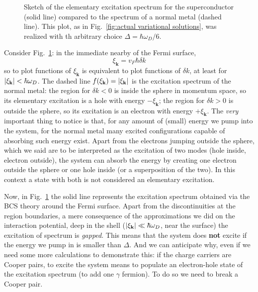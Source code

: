 \begin{figure}
	\centering
	
	\caption{Sketch of the elementary excitation spectrum for the superconductor (solid line) compared to the spectrum of a normal metal (dashed line). This plot, as in Fig.~\ref{fig:actual variational solutions}, was realized with th arbitrary choice $\Delta=\hbar\omega_D/6$.}
	\label{fig:excitation spectrum}
\end{figure}

Consider Fig.~\ref{fig:excitation spectrum}: in the immediate nearby of the Fermi surface,
\[
	\xi_\mathbf{k} = v_F \hbar \delta k
\]
so to plot functions of $\xi_{\mathbf{k}}$ is equivalent to plot functions of $\delta k$, at least for $\abs{\xi_\mathbf{k}} < \hbar\omega_D$. The dashed line $f(\xi_{\mathbf{k}}) = \abs{\xi_{\mathbf{k}}}$ is the excitation spectrum of the normal metal: the region for $\delta k < 0$ is inside the sphere in momentum space, so its elementary excitation is a hole with energy $-\xi_{\mathbf{k}}$; the region for $\delta k > 0$ is outside the sphere, so its excitation is an electron with energy $+\xi_{\mathbf{k}}$. The \textit{very} important thing to notice is that, for any amount of (small) energy we pump into the system, for the normal metal many excited configurations capable of absorbing such energy exist. Apart from the electrons jumping outside the sphere, which we said are to be interpreted as the excitation of two modes (hole inside, electron outside), the system can absorb the energy by creating one electron outside the sphere or one hole inside (or a superposition of the two). In this context a state with both is not considered an elementary excitation.

Now, in Fig.~\ref{fig:excitation spectrum} the solid line represents the excitation spectrum obtained via the BCS theory around the Fermi surface. Apart from the discontinuities at the region boundaries, a mere consequence of the approximations we did on the interaction potential, deep in the shell ($\abs{\xi_\mathbf{k}}\ll\hbar\omega_D$, near the surface) the excitation of spectrum is \textit{gapped}. This means that the system does \textbf{not} excite if the energy we pump in is smaller than $\Delta$. And we can anticipate why, even if we need some more calculations to demonstrate this: if the charge carriers are Cooper pairs, to excite the system means to populate an electron-hole state of the excitation spectrum (to add one $\gamma$ fermion). To do so we need to break a Cooper pair.

